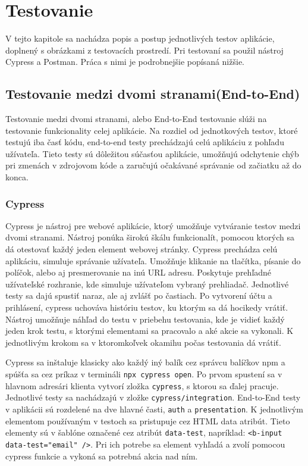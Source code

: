 \chapter{Testovanie}
\label{kapitola6}
V tejto kapitole sa nachádza popis a postup jednotlivých testov aplikácie, doplnený s obrázkami z testovacích prostredí. Pri testovaní sa použil nástroj Cypress a Postman. Práca s nimi je podrobnejšie popísaná nižšie.  

\section{Testovanie medzi dvomi stranami(End-to-End)}
Testovanie medzi dvomi stranami, alebo End-to-End testovanie slúži na testovanie funkcionality celej aplikácie. Na rozdiel od jednotkových testov, ktoré testujú iba časť kódu, end-to-end testy prechádzajú celú aplikáciu z pohľadu užívateľa. Tieto testy sú dôležitou súčasťou aplikácie, umožňujú odchytenie chýb pri zmenách v zdrojovom kóde a zaručujú očakávané správanie od začiatku až do konca.

\subsection{Cypress}
Cypress je nástroj pre webové aplikácie, ktorý umožňuje vytváranie testov medzi dvomi stranami. Nástroj ponúka širokú škálu funkcionalít, pomocou ktorých sa dá otestovať každý jeden element webovej stránky. Cypress prechádza celú aplikáciu, simuluje správanie užívateľa. Umožňuje klikanie na tlačítka, písanie do políčok, alebo aj presmerovanie na inú URL adresu. Poskytuje prehľadné užívateľské rozhranie, kde simuluje užívateľom vybraný prehliadač. Jednotlivé testy sa dajú spustiť naraz, ale aj zvlášť po častiach. Po vytvorení účtu a prihlásení, cypress uchováva históriu testov, ku ktorým sa dá hocikedy vrátiť. Nástroj umožňuje náhľad do testu v priebehu testovania, kde je vidieť každý jeden krok testu, s ktorými elementami sa pracovalo a aké akcie sa vykonali. K jednotlivým krokom sa v ktoromkoľvek okamihu počas testovania dá vrátiť.

Cypress sa inštaluje klasicky ako každý iný balík cez správcu balíčkov npm a spúšťa sa cez príkaz v termináli \texttt{npx cypress open}. Po prvom spustení sa v hlavnom adresári klienta vytvorí zložka \texttt{cypress}, s ktorou sa ďalej pracuje. Jednotlivé testy sa nachádzajú v zložke \texttt{cypress/integration}. End-to-End testy v aplikácii sú rozdelené na dve hlavné časti, \texttt{auth} a \texttt{presentation}. K jednotlivým elementom používaným v testoch sa pristupuje cez HTML data atribút. Tieto elementy sú v šablóne označené cez atribút \texttt{data-test}, napríklad: \texttt{<b-input data-test="email" />}. Pri ich potrebe sa element vyhľadá a zvolí pomocou cypress funkcie a vykoná sa potrebná akcia nad ním.

